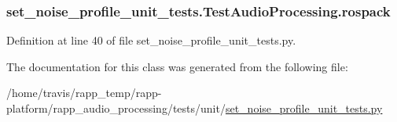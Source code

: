 \hypertarget{classset__noise__profile__unit__tests_1_1TestAudioProcessing_a9cee1cae109530cd693c9e859b33a7f8}{
\subsubsection[{rospack}]{\setlength{\rightskip}{0pt plus 5cm}set\-\_\-noise\-\_\-profile\-\_\-unit\-\_\-tests.\-Test\-Audio\-Processing.\-rospack}}\label{classset__noise__profile__unit__tests_1_1TestAudioProcessing_a9cee1cae109530cd693c9e859b33a7f8}


Definition at line 40 of file set\-\_\-noise\-\_\-profile\-\_\-unit\-\_\-tests.\-py.



The documentation for this class was generated from the following file\-:\begin{DoxyCompactItemize}
\item 
/home/travis/rapp\-\_\-temp/rapp-\/platform/rapp\-\_\-audio\-\_\-processing/tests/unit/\hyperlink{set__noise__profile__unit__tests_8py}{set\-\_\-noise\-\_\-profile\-\_\-unit\-\_\-tests.\-py}\end{DoxyCompactItemize}
